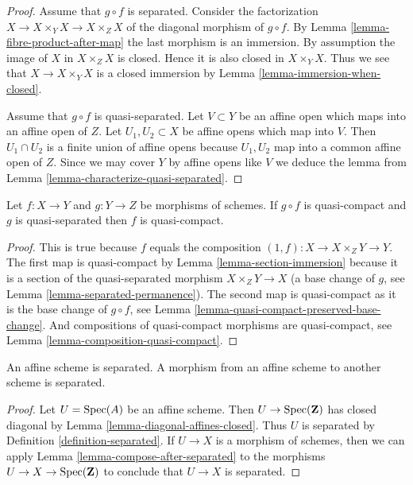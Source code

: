 \begin{proof}
Assume that $g \circ f$ is separated.
Consider the factorization $X \to X \times_Y X \to X \times_Z X$
of the diagonal morphism of $g \circ f$.
By Lemma \ref{lemma-fibre-product-after-map}
the last morphism is an immersion. By assumption the image
of $X$ in $X \times_Z X$ is closed. Hence it is also closed
in $X \times_Y X$. Thus we see that $X \to X \times_Y X$
is a closed immersion by Lemma \ref{lemma-immersion-when-closed}.

\medskip\noindent
Assume that $g \circ f$ is quasi-separated.
Let $V \subset Y$ be an affine open which maps into an affine
open of $Z$. Let $U_1, U_2 \subset X$ be affine opens which
map into $V$. Then $U_1 \cap U_2$ is a finite union of affine
opens because $U_1, U_2$ map into a common affine open
of $Z$. Since we may cover $Y$ by affine opens like $V$ we
deduce the lemma from Lemma \ref{lemma-characterize-quasi-separated}.
\end{proof}

\begin{lemma}
\label{lemma-quasi-compact-permanence}
Let $f : X \to Y$ and $g : Y \to Z$ be morphisms of schemes.
If $g \circ f$ is quasi-compact and $g$ is quasi-separated
then $f$ is quasi-compact.
\end{lemma}

\begin{proof}
This is true because $f$ equals the composition
$(1, f) : X \to X \times_Z Y \to Y$. The first map
is quasi-compact by Lemma \ref{lemma-section-immersion}
because it is a section of the quasi-separated morphism $X \times_Z Y \to X$
(a base change of $g$, see Lemma \ref{lemma-separated-permanence}).
The second map is quasi-compact as it
is the base change of $g \circ f$, see
Lemma \ref{lemma-quasi-compact-preserved-base-change}.
And compositions of quasi-compact
morphisms are quasi-compact, see Lemma \ref{lemma-composition-quasi-compact}.
\end{proof}

\begin{lemma}
\label{lemma-affine-separated}
An affine scheme is separated. A morphism from an affine scheme
to another scheme is separated.
\end{lemma}

\begin{proof}
Let $U = \mathop{\mathrm{Spec}}(A)$ be an affine scheme. Then $U \to \mathop{\mathrm{Spec}}(\mathbf{Z})$
has closed diagonal by Lemma \ref{lemma-diagonal-affines-closed}.
Thus $U$ is separated by Definition \ref{definition-separated}.
If $U \to X$ is a morphism of schemes, then we can apply
Lemma \ref{lemma-compose-after-separated}
to the morphisms $U \to X \to \mathop{\mathrm{Spec}}(\mathbf{Z})$ to conclude
that $U \to X$ is separated.
\end{proof}

